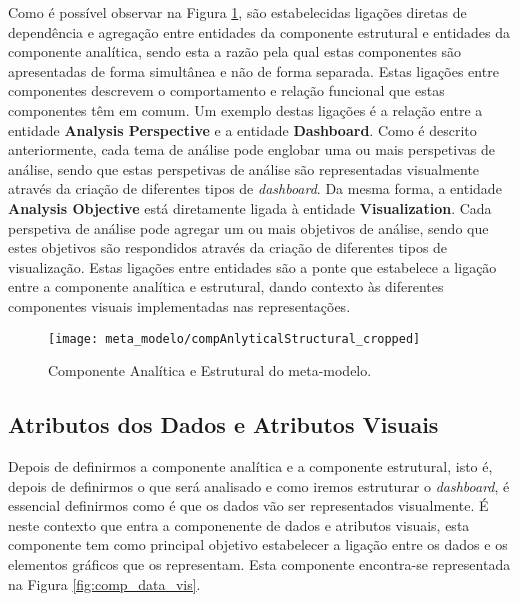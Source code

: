 Como é possível observar na Figura \ref{fig:comp_anal_struct}, são estabelecidas ligações diretas de dependência e agregação entre entidades da componente estrutural e entidades da componente analítica, sendo esta a razão pela qual estas componentes são apresentadas de forma simultânea e não de forma separada. Estas ligações entre componentes descrevem o comportamento e relação funcional que estas componentes têm em comum. Um exemplo destas ligações é a relação entre a entidade \textbf{Analysis Perspective} e a entidade \textbf{Dashboard}. Como é descrito anteriormente, cada tema de análise pode englobar uma ou mais perspetivas de análise, sendo que estas perspetivas de análise são representadas visualmente através da criação de diferentes tipos de \textit{dashboard}. Da mesma forma, a entidade \textbf{Analysis Objective} está diretamente ligada à entidade \textbf{Visualization}. Cada perspetiva de análise pode agregar um ou mais objetivos de análise, sendo que estes objetivos são respondidos através da criação de diferentes tipos de visualização. Estas ligações entre entidades são a ponte que estabelece a ligação entre a componente analítica e estrutural, dando contexto às diferentes componentes visuais implementadas nas representações.

\begin{figure}[htbp]
  \texttt{[image: meta\_modelo/compAnlyticalStructural\_cropped]}
  \centering
  \caption{Componente Analítica e Estrutural do meta-modelo.}
  \label{fig:comp_anal_struct}
\end{figure}

\subsection{Atributos dos Dados e Atributos Visuais} %
\label{sub:data_vis_attr}

Depois de definirmos a componente analítica e a componente estrutural, isto é, depois de definirmos o que será analisado e como iremos estruturar o \textit{dashboard}, é essencial definirmos como é que os dados vão ser representados visualmente. É neste contexto que entra a componenente de dados e atributos visuais, esta componente tem como principal objetivo estabelecer a ligação entre os dados e os elementos gráficos que os representam. Esta componente encontra-se representada na Figura \ref{fig:comp_data_vis}.

